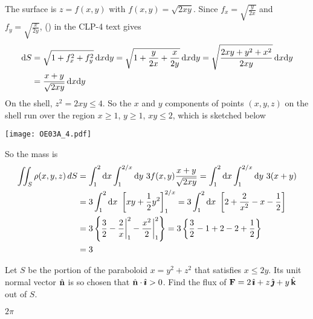 \begin{solution} 
The surface is $z=f(x,y)$ with $f(x,y)=\sqrt{2xy}$. Since
$f_x=\sqrt{\frac{y}{2x}}$ and $f_y=\sqrt{\frac{x}{2y}}$,
() in the CLP-4 text gives
\begin{align*}
\mathrm{d}S&=\sqrt{1+f_x^2+f_y^2}\,\mathrm{d}x\mathrm{d}y
=\sqrt{1+\frac{y}{2x}+\frac{x}{2y}}\,\mathrm{d}x\mathrm{d}y
=\sqrt{\frac{2xy+y^2+x^2}{2xy}}\,\mathrm{d}x\mathrm{d}y \\
&=\frac{x+y}{\sqrt{2xy}}\,\mathrm{d}x\mathrm{d}y
\end{align*}
On the shell, $z^2=2xy\le 4$. So the $x$ and $y$ components of 
points $(x,y,z)$ on the shell run over the region $x\ge 1$, $y\ge 1$, 
$xy\le 2$, which
is sketched below
\begin{center}
     \texttt{[image: OE03A\_4.pdf]}
\end{center}
So the mass is
\begin{align*}
\iint_S \rho(x,y,z)\,dS
&=\int_1^2\mathrm{d}x\int_1^{2/x}\mathrm{d}y\ 3f(x,y)\frac{x+y}{\sqrt{2xy}}
=\int_1^2\mathrm{d}x\int_1^{2/x}\mathrm{d}y\ 3(x+y) \\
&=3\int_1^2\mathrm{d}x\ \left[xy+\frac{1}{2} y^2\right]_1^{2/x}
=3\int_1^2 \mathrm{d}x\ \left[2+\frac{2}{x^2}-x-\frac{1}{2}\right] \\
&=3\left\{\frac{3}{2}-\frac{2}{x}\bigg|_1^2-\frac{x^2}{2}\bigg|^2_1\right\}
=3\left\{\frac{3}{2}-1+2-2+\frac{1}{2}\right\} \\
&=3
\end{align*}
\end{solution}


\begin{question}[M317 2003A] %
Let $S$ be the portion of the paraboloid $x=y^2 + z^2$ that satisfies
$x \le 2 y $. Its unit normal vector $\hat{\mathbf{n}}$ is so chosen that
$\hat{\mathbf{n}} \cdot \hat{\pmb{\imath}} > 0$. Find the flux of 
$\mathbf{F} =  2\,\hat{\pmb{\imath}} +  z\,\hat{\pmb{\jmath}} + y\,\hat{\mathbf{k}}$ out of $S$.
\end{question}


\begin{answer} 
$2\pi$
\end{answer}

